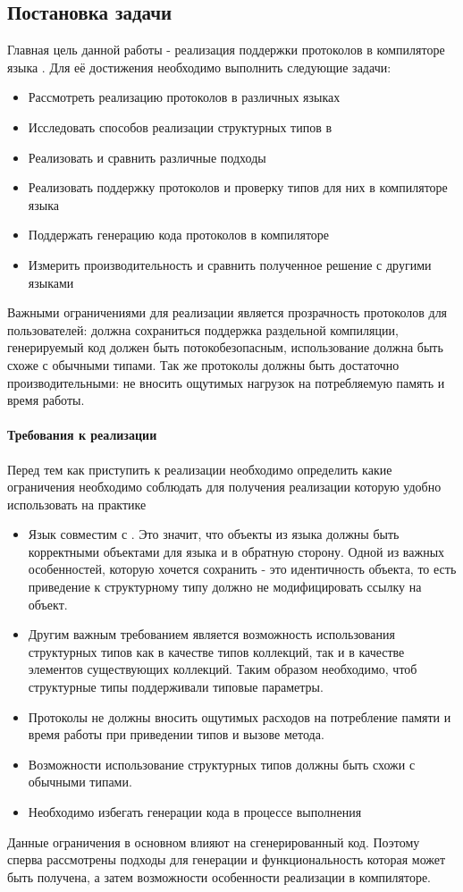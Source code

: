 \subsection{Постановка задачи}
Главная цель данной работы - реализация поддержки протоколов в компиляторе языка . Для её достижения необходимо выполнить следующие задачи:
\begin{itemize}
    \item Рассмотреть реализацию протоколов в различных языках
    \item Исследовать способов реализации структурных типов в 
    \item Реализовать и сравнить различные подходы
    \item Реализовать поддержку протоколов и проверку типов для них в компиляторе языка 
    \item Поддержать генерацию кода протоколов в компиляторе
    \item Измерить производительность и сравнить полученное решение с другими языками
\end{itemize}

Важными ограничениями для реализации является прозрачность протоколов для пользователей: должна сохраниться поддержка раздельной компиляции, генерируемый код должен быть потокобезопасным, использование должна быть схоже с обычными типами. Так же протоколы должны быть достаточно производительными: не вносить ощутимых нагрузок на потребляемую память и время работы.

\paragraph{Требования к реализации}
Перед тем как приступить к реализации необходимо определить какие ограничения необходимо соблюдать для получения реализации которую удобно использовать на практике

\begin{itemize}
  \item Язык  совместим с . Это значит, что объекты из языка  должны быть корректными объектами для языка  и в обратную сторону. Одной из важных особенностей, которую хочется сохранить - это идентичность объекта, то есть приведение к структурному типу должно не модифицировать ссылку на объект.
\item Другим важным требованием является возможность использования структурных типов как в качестве типов коллекций, так и в качестве элементов существующих коллекций. Таким образом необходимо, чтоб структурные типы поддерживали типовые параметры.
\item Протоколы не должны вносить ощутимых расходов на потребление памяти и время работы при приведении типов и вызове метода.
\item Возможности использование структурных типов должны быть схожи с обычными типами.
\item Необходимо избегать генерации кода в процессе выполнения
\end{itemize}

Данные ограничения в основном влияют на сгенерированный код. Поэтому сперва рассмотрены подходы для генерации и функциональность которая может быть получена, а затем возможности особенности реализации в компиляторе.
